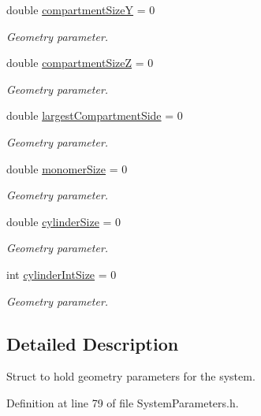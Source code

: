 \begin{DoxyCompactItemize}
double \hyperlink{structGeometryParameters_a6364473fe0575150e254838e4c91e610}{compartment\+Size\+Y} = 0
\begin{DoxyCompactList}\small\item\em Geometry parameter. \end{DoxyCompactList}\item 
double \hyperlink{structGeometryParameters_a6c0c575c958ad3c0625f63ae3302575c}{compartment\+Size\+Z} = 0
\begin{DoxyCompactList}\small\item\em Geometry parameter. \end{DoxyCompactList}\item 
double \hyperlink{structGeometryParameters_a0b14f97d476bd4d40bf32a75715814b0}{largest\+Compartment\+Side} = 0
\begin{DoxyCompactList}\small\item\em Geometry parameter. \end{DoxyCompactList}\item 
double \hyperlink{structGeometryParameters_a7afc14cf30bc80757522bcabe8fb3bc9}{monomer\+Size} = 0
\begin{DoxyCompactList}\small\item\em Geometry parameter. \end{DoxyCompactList}\item 
double \hyperlink{structGeometryParameters_ab269206056f9e28193129ca5d31d8b30}{cylinder\+Size} = 0
\begin{DoxyCompactList}\small\item\em Geometry parameter. \end{DoxyCompactList}\item 
int \hyperlink{structGeometryParameters_a4ea73a722482f66eeaedfb57435f35d1}{cylinder\+Int\+Size} = 0
\begin{DoxyCompactList}\small\item\em Geometry parameter. \end{DoxyCompactList}\end{DoxyCompactItemize}



\subsection{Detailed Description}
Struct to hold geometry parameters for the system. 

Definition at line 79 of file System\+Parameters.\+h.



